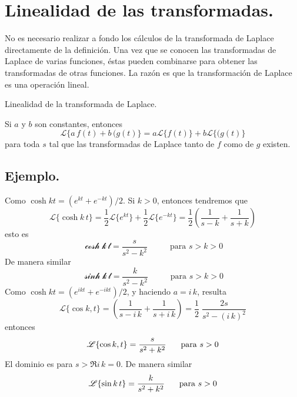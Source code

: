 \section{Linealidad de las transformadas.}
No es necesario realizar a fondo los cálculos de la transformada de Laplace directamente de la definición. Una vez que se conocen las transformadas de Laplace de varias funciones, éstas pueden combinarse para obtener las transformadas de otras funciones. La razón es que la transformación de Laplace es una operación lineal.
\begin{teo}{Linealidad de la transformada de Laplace.}

Si $a$ y $b$ son constantes, entonces
\begin{equation}
\mathscr{L} \{ a \, f(t) +  b \, (g(t) \} = a \mathscr{L} \{ f(t) \} + b \mathscr{L} \{ (g(t) \}
\label{eq:012}
\end{equation}
para toda $s$ tal que las transformadas de Laplace tanto de $f$ como de $g$ existen.
\end{teo}
\subsection*{Ejemplo.}
Como $\cosh kt = (e^{kt} + e^{-kt}) / 2$. Si $k > 0$, entonces tendremos que
\[ \mathscr{L} \{ \cosh k \, t \} = \dfrac{1}{2} \mathscr{L} \{ e^{kt} \} + \dfrac{1}{2} \mathscr{L} \{ e^{-kt} \} = \dfrac{1}{2} \left( \dfrac{1}{s - k} + \dfrac{1}{s + k} \right) \]
esto es
\begin{equation}
\mathscr{ \cosh k \, t} = \dfrac{s}{s^{2} - k^{2}} \hspace{1cm} \mbox{ para } s > k > 0
\label{eq:014}
\end{equation}
De manera similar
\begin{equation}
\mathscr{ \sinh k \, t} = \dfrac{k}{s^{2} - k^{2}} \hspace{1cm} \mbox{ para } s > k > 0
\label{eq:015}
\end{equation}
Como $\cosh kt = (e^{ikt} + e^{-ikt})/2$, y haciendo $a = i \, k$, resulta
\[ \mathscr{L} \{ \cos k , t \} = \left( \dfrac{1}{s - i \, k} + \dfrac{1}{s + i \, k} \right) =  \dfrac{1}{2} \; \dfrac{2s}{s^{2} - (i \, k)^{2}} \]
entonces
\begin{equation}
\mathscr{L} \{ \cos k , t \} = \dfrac{s}{s^{2} + k^{2}} \hspace{0.5cm} \mbox{ para } s > 0
\label{eq:016}
\end{equation}
El dominio es para $s > \Re{i \, k} = 0$. De manera similar
\begin{equation}
\mathscr{L} \{ \sin k \, t \} = \dfrac{k}{s^{2} + k^{2}} \hspace{0.5cm} \mbox{ para } s > 0
\label{eq:017}
\end{equation}
